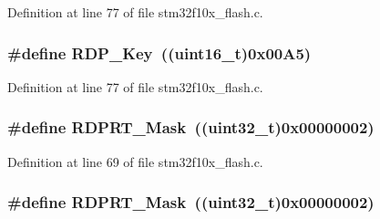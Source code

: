 Definition at line 77 of file stm32f10x\+\_\+flash.\+c.

\subsubsection[{\texorpdfstring{R\+D\+P\+\_\+\+Key}{RDP_Key}}]{\setlength{\rightskip}{0pt plus 5cm}\#define R\+D\+P\+\_\+\+Key~(({\bf uint16\+\_\+t})0x00\+A5)}\hypertarget{group___f_l_a_s_h___private___defines_ga34ec82060edcc9a18bf804b07dec5881}{}\label{group___f_l_a_s_h___private___defines_ga34ec82060edcc9a18bf804b07dec5881}


Definition at line 77 of file stm32f10x\+\_\+flash.\+c.

\subsubsection[{\texorpdfstring{R\+D\+P\+R\+T\+\_\+\+Mask}{RDPRT_Mask}}]{\setlength{\rightskip}{0pt plus 5cm}\#define R\+D\+P\+R\+T\+\_\+\+Mask~(({\bf uint32\+\_\+t})0x00000002)}\hypertarget{group___f_l_a_s_h___private___defines_gaa624b669116384b971b838ae201cad9f}{}\label{group___f_l_a_s_h___private___defines_gaa624b669116384b971b838ae201cad9f}


Definition at line 69 of file stm32f10x\+\_\+flash.\+c.

\subsubsection[{\texorpdfstring{R\+D\+P\+R\+T\+\_\+\+Mask}{RDPRT_Mask}}]{\setlength{\rightskip}{0pt plus 5cm}\#define R\+D\+P\+R\+T\+\_\+\+Mask~(({\bf uint32\+\_\+t})0x00000002)}\hypertarget{group___f_l_a_s_h___private___defines_gaa624b669116384b971b838ae201cad9f}{}\label{group___f_l_a_s_h___private___defines_gaa624b669116384b971b838ae201cad9f}


